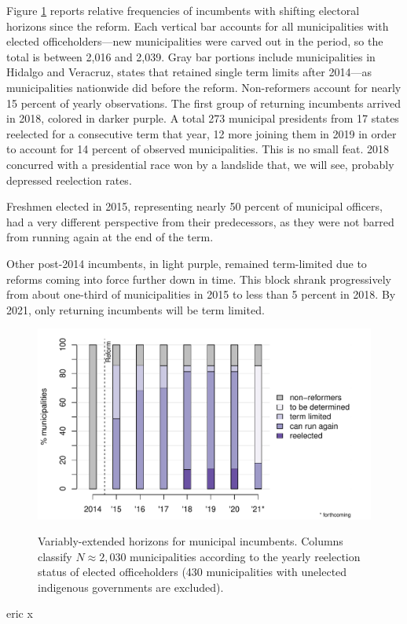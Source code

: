 \documentclass[letter,12pt]{article}
\begin{document}
Figure \ref{F:horizons} reports relative frequencies of incumbents with shifting electoral horizons since the reform. Each vertical bar accounts for all municipalities with elected officeholders---new municipalities were carved out in the period, so the total is between 2,016 and 2,039. Gray bar portions include municipalities in Hidalgo and Veracruz, states that retained single term limits after 2014---as municipalities nationwide did before the reform. Non-reformers account for nearly 15 percent of yearly observations. The first group of returning incumbents arrived in 2018, colored in darker purple. A total 273 municipal presidents from 17 states reelected for a consecutive term that year, 12 more joining them in 2019 in order to account for 14 percent of observed municipalities. This is no small feat. 2018 concurred with a presidential race won by a landslide that, we will see, probably depressed reelection rates. 

Freshmen elected in 2015, representing nearly 50 percent of municipal officers, had a very different perspective from their predecessors, as they were not barred from running again at the end of the term.  

Other post-2014 incumbents, in light purple, remained term-limited due to reforms coming into force further down in time. This block shrank progressively from about one-third of municipalities in 2015 to less than 5 percent in 2018. By 2021, only returning incumbents will be term limited. 

\begin{figure}
  \centering
  \includegraphics[width=.8\columnwidth]{../graph/horizon-yrs.pdf} \\
  \caption{Variably-extended horizons for municipal incumbents. Columns classify $N\approx2,030$ municipalities according to the yearly reelection status of elected officeholders (430 municipalities with unelected indigenous governments are excluded).}\label{F:horizons}
\end{figure}
eric  x
\end{document}
